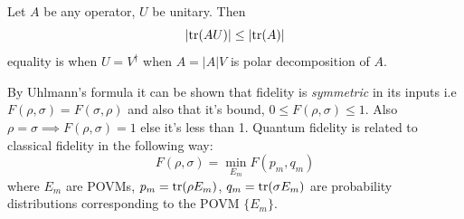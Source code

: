 \begin{lemma}
    Let $A$ be any operator, $U$ be unitary. Then
    \begin{equation}
        |\text{tr}(AU)| \leq |\text{tr}(A)|
    \end{equation}
    equality is when $U=V^\dag$ when $A=|A|V$ is polar decomposition of $A$.
\end{lemma}
By Uhlmann's formula it can be shown that fidelity is \textit{symmetric} in its inputs i.e $F(\rho, \sigma) = F(\sigma, \rho)$ and also that it's bound, $0 \leq F(\rho, \sigma) \leq 1$. Also $\rho=\sigma \implies F(\rho, \sigma)=1$ else it's less than 1. Quantum fidelity is related to classical fidelity in the following way:
\begin{equation}
    F(\rho, \sigma) = \min_{E_m} F(p_m, q_m)
\end{equation}
where $E_m$ are POVMs, $p_m = \text{tr}(\rho E_m)$, $q_m = \text{tr}(\sigma E_m)$ are probability distributions corresponding to the POVM $\{ E_m \}$. 

